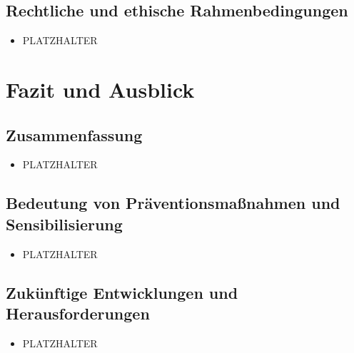 \documentclass[12pt, a4paper, oneside]{scrartcl}
\begin{document}
\subsection{Rechtliche und ethische Rahmenbedingungen}
\begin{itemize}
  \item PLATZHALTER
\end{itemize}

\section{Fazit und Ausblick}

\subsection{Zusammenfassung}
\begin{itemize}
  \item PLATZHALTER
\end{itemize}

\subsection{Bedeutung von Präventionsmaßnahmen und Sensibilisierung}
\begin{itemize}
  \item PLATZHALTER
\end{itemize}

\subsection{Zukünftige Entwicklungen und Herausforderungen}
\begin{itemize}
  \item PLATZHALTER
\end{itemize}

\clearpage
\printbibliography[title={Literaturverzeichnis}]
\end{document}
